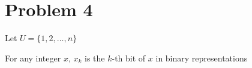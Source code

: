\section*{Problem 4}

Let $U = \{1,2,\dots,n\}$

For any integer $x$, $x_k$ is the $k$-th bit of $x$ in binary representations





\pagebreak